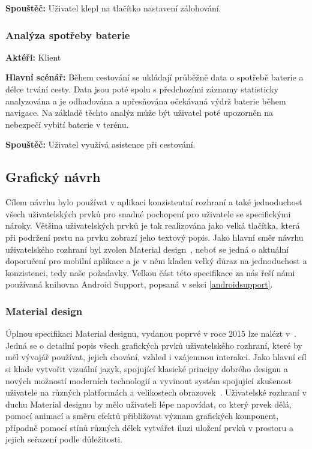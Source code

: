 \documentclass[czech,master,public,dept460,male,java,cpdeclaration]{diploma}
\newcommand{\usecase}[2]{\subsubsection{#1}\label{#2}}
\begin{document}
\vspace{0.1cm}
\noindent
\textbf{Spouštěč:} Uživatel klepl na tlačítko nastavení zálohování.


\usecase{Analýza spotřeby baterie}{analyzabaterie}
\textbf{Aktéři:} Klient

\vspace{0.1cm}
\noindent
\textbf{Hlavní scénář:} Během cestování se ukládají průběžně data o spotřebě baterie a délce trvání
cesty. Data jsou poté spolu s předchozími záznamy statisticky analyzována a je odhadována a upřesňována
očekávaná výdrž baterie během navigace. Na základě těchto analýz může být uživatel poté upozorněn na
nebezpečí vybití baterie v terénu.

\vspace{0.1cm}
\noindent
\textbf{Spouštěč:} Uživatel využívá asistence při cestování.



\subsection{Grafický návrh}
Cílem návrhu bylo používat v aplikaci konzistentní rozhraní a také jednoduchost všech uživatelských
prvků pro snadné pochopení pro uživatele se specifickými nároky. Většina uživatelských prvků je tak
realizována jako velká tlačítka, která při podržení prstu na prvku zobrazí jeho textový popis.
Jako hlavní směr návrhu uživatelského rozhraní byl zvolen Material design~\cite{materialdesign}, neboť se jedná o aktuální
doporučení pro mobilní aplikace a je v něm kladen velký důraz na jednoduchost a konzistenci,
tedy naše požadavky. Velkou část této specifikace za nás řeší námi používaná knihovna Android Support,
popsaná v sekci \ref{androidsupport}.

\subsubsection{Material design}
Úplnou specifikaci Material designu, vydanou poprvé v roce 2015 lze nalézt v~\cite{materialdesign}.
Jedná se o detailní popis všech
grafických prvků uživatelského rozhraní, které by měl vývojář používat, jejich chování, vzhled i vzájemnou
 interakci. Jako hlavní cíl si klade vytvořit vizuální jazyk, spojující klasické principy dobrého designu
  a nových možností moderních technologií a vyvinout systém spojující zkušenost uživatele na různých
  platformách a velikostech obrazovek~\cite{materialdesign}. Uživatelské rozhraní v duchu Material designu
  by mělo uživateli lépe napovídat, co který prvek dělá, pomocí animací a směru efektů přibližovat
  význam grafických komponent, případně pomocí stínů různých délek vytvářet iluzi uložení prvků
  v prostoru a jejich seřazení podle důležitosti.
\end{document}

